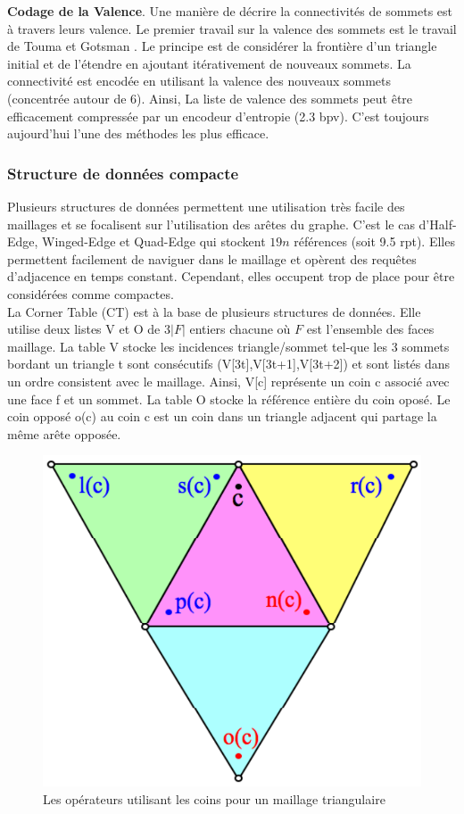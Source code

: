 \documentclass[a4paper,11pt,openany]{article}
\begin{document}
\noindent
\textbf{Codage de la Valence}. Une manière de décrire la connectivités de sommets est à travers leurs valence. Le premier travail sur la valence des sommets est le travail de Touma et Gotsman \cite{valence_encoding}. Le principe est de considérer la frontière d'un triangle initial et de l'étendre en ajoutant itérativement de nouveaux sommets. La connectivité est encodée en utilisant la valence des nouveaux sommets (concentrée autour de 6). Ainsi, La liste de valence des sommets peut être efficacement compressée par un encodeur d'entropie (2.3 bpv). C'est toujours aujourd'hui l'une des méthodes les plus efficace.
\subsubsection{Structure de données compacte}
\noindent
Plusieurs structures de données permettent une utilisation très facile des maillages et se focalisent sur l'utilisation des arêtes du graphe. C'est le cas d'Half-Edge, Winged-Edge \cite{winged_edge} et Quad-Edge qui stockent $19n$ références (soit 9.5 rpt). Elles permettent facilement de naviguer dans le maillage et opèrent des requêtes d'adjacence en temps constant. Cependant, elles occupent trop de place pour être considérées comme compactes.\\
La Corner Table (CT) est à la base de plusieurs structures de données. Elle utilise deux listes V et O de $3|F|$ entiers chacune où $F$ est l'ensemble des faces maillage. La table V stocke les incidences triangle/sommet tel-que les 3 sommets bordant un triangle t sont consécutifs (V[3t],V[3t+1],V[3t+2]) et sont listés dans un ordre consistent avec le maillage. Ainsi, V[c] représente un coin c associé avec une face f et un sommet. La table O stocke la référence entière du coin oposé. Le coin opposé o(c) au coin c est un coin dans un triangle adjacent qui partage la même arête opposée.
\begin{figure}[H]
\begin{center}
\includegraphics[scale=0.2]{Images/corner_table}
\caption{Les opérateurs utilisant les coins pour un maillage triangulaire}
\label{fig:corner_table}
\end{center}
\end{figure}
\end{document}
